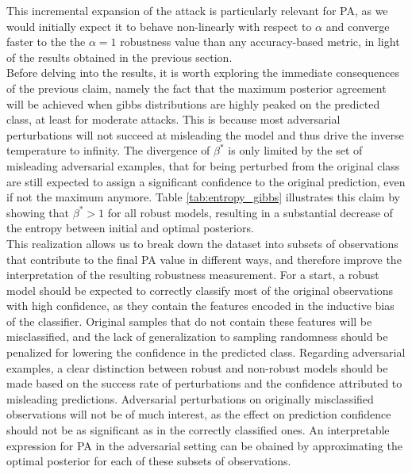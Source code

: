 This incremental expansion of the attack is particularly relevant for PA, as we would initially 
expect it to behave non-linearly with respect to $\alpha$ and converge faster to
the the $\alpha=1$ robustness value than any accuracy-based metric, in light of the results obtained
in the previous section. \\

Before delving into the results, it is worth exploring the immediate consequences
of the previous claim, namely the fact that the maximum posterior agreement will
be achieved when gibbs distributions are highly peaked on the predicted 
class, at least for moderate attacks. This is because most adversarial 
perturbations will not succeed at misleading the model and thus drive the inverse temperature to
infinity. The divergence of $\beta^{*}$ is only limited by the set of misleading adversarial 
examples, that for being perturbed from the original class are still expected to assign a
significant confidence to the original prediction, even if not the maximum anymore.
Table \ref{tab:entropy_gibbs} illustrates this claim by showing that $\beta^{*} > 1$ 
for all robust models, resulting in a substantial decrease of the entropy between initial and 
optimal posteriors. \\

This realization allows us to break down the dataset into subsets of observations
that contribute to the final PA value in different ways, and therefore improve
the interpretation of the resulting robustness measurement.
For a start, a robust model should be expected to correctly classify most of the 
original observations with high confidence, as they
contain the features encoded in the inductive bias of the 
classifier. Original samples that do not contain these features will be misclassified,
and the lack of generalization to sampling randomness should be penalized for lowering
the confidence in the predicted class. Regarding adversarial examples, a clear
distinction between robust and non-robust models should be made based on the success 
rate of perturbations and the confidence attributed to misleading predictions. Adversarial 
perturbations on originally misclassified observations will not be of much interest,
as the effect on prediction confidence should not be as significant as in
the correctly classified ones. An interpretable expression for PA in the adversarial
setting can be obained by approximating the optimal posterior for each of these
subsets of observations. \\

